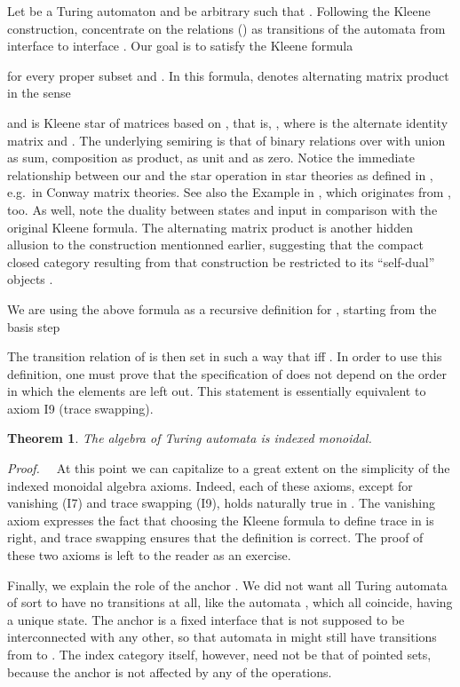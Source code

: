 \documentclass{eptcs}
\newtheorem{theorem}{Theorem}
\begin{document}
Let  be a Turing automaton and  be arbitrary 
such that . Following the Kleene construction, concentrate on the relations 
 () as transitions of the automata
 from interface  to interface . Our goal is to satisfy the
Kleene formula
\vspmini

for every proper subset  and . In this
formula,  denotes alternating matrix product in the sense
\vspmini

and  is Kleene star of  matrices based on , that is,
, where  is the alternate identity matrix 
 and 
. The underlying semiring  is that of binary relations
over  with union as sum, composition as product,  as unit and 
as zero. Notice the immediate relationship between our  and the star
operation in star theories as defined in \cite{iter}, e.g.\ in Conway matrix
theories. See also the Example in \cite{tra}, which originates from
\cite{iter}, too. As well, note the 
duality between states and input in comparison with the original Kleene formula.
The alternating matrix product is another hidden allusion to the  construction
\cite{tra} mentionned earlier, suggesting that the compact closed category resulting
from that construction be restricted to its ``self-dual'' objects .

We are using the above formula as a recursive definition for , starting
from the basis step 

The transition relation  of  is then set 
in such a way that  iff .
In order to use this definition, one must prove that the specification of
 does not depend on the order in which the elements 
are left out. This statement is essentially equivalent to axiom I9 (trace swapping).
\begin{theorem}
The algebra  of Turing automata is indexed monoidal.
\end{theorem}
{\em Proof.\ \ }
At this point we can capitalize to a great extent on the simplicity of the indexed
monoidal algebra axioms. Indeed, each of these axioms, except for vanishing (I7)
and trace swapping (I9), holds naturally true in . The vanishing axiom
expresses the fact that choosing the Kleene formula to define trace in 
is right, and trace
swapping ensures that the definition is correct. The proof of these two axioms
is left to the reader as an exercise. 
\vege


Finally, we explain the role of the anchor . We did not want all Turing automata
of sort  to have no transitions at all, like the automata , which all coincide, having a unique state. The
anchor is a fixed interface that is not supposed to be interconnected with any
other, so that automata in  might still have transitions from  to .
The index category itself, however, need not be
that of pointed sets, because the anchor is not affected by any of the operations.
\end{document}
